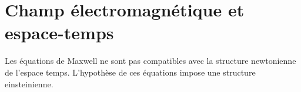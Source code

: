 
\section{Champ électromagnétique et espace-temps}
%
Les équations de Maxwell ne sont pas compatibles avec la structure newtonienne de l'espace temps. L'hypothèse de ces équations impose une structure einsteinienne.



